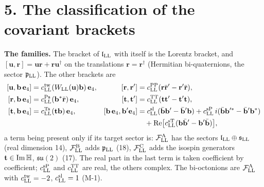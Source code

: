 \documentclass[
  10pt,
]{article}
\begin{document}
\hypertarget{the-classification-of-the-covariant-brackets}{%
\section{5. The classification of the covariant
brackets}\label{the-classification-of-the-covariant-brackets}}

\textbf{The families.} The bracket of \(\mathfrak l_{\rm LL}\) with
itself is the Lorentz bracket, and
\([\mathbf u,\mathbf r]=\mathbf u\mathbf r+\mathbf r\mathbf u^\dagger\)
on the translations \(\mathbf r=\mathbf r^\dagger\) (Hermitian
bi-quaternions, the sector \(\mathfrak p_{\rm LL}\)). The other brackets
are \[\begin{aligned}
[\mathbf u,\mathbf b\,\mathbf e_4]&=c^{\rm tw}_{\rm LL}(W_{\rm LL}(\mathbf u)\mathbf b)\,\mathbf e_4, &
[\mathbf r,\mathbf r']&=c^{\rm PP}_{\rm LL}(\mathbf r\bar{\mathbf r}'-\mathbf r'\bar{\mathbf r}),\\
[\mathbf r,\mathbf b\,\mathbf e_4]&=c^{\rm Ps}_{\rm LL}(\mathbf b^*\bar{\mathbf r})\,\mathbf e_4, &
[\mathbf t,\mathbf t']&=c^{\rm TT}_{\rm LL}(\mathbf t\mathbf t'-\mathbf t'\mathbf t),\\
[\mathbf t,\mathbf b\,\mathbf e_4]&=c^{\rm Ts}_{\rm LL}(\mathbf t\mathbf b)\,\mathbf e_4, &
[\mathbf b\,\mathbf e_4,\mathbf b'\mathbf e_4]&=c^{\rm sl}_{\rm LL}(\bar{\mathbf b}\mathbf b'-\bar{\mathbf b}'\mathbf b)+c^{\rm sP}_{\rm LL}\,i(\bar{\mathbf b}\mathbf b'^*-\bar{\mathbf b}'\mathbf b^*)\\
&&&\quad+\mathrm{Re}\big[c^{\rm sT}_{\rm LL}(\mathbf b\bar{\mathbf b}'-\mathbf b'\bar{\mathbf b})\big],
\end{aligned}\] a term being present only if its target sector is:
\(\mathcal F^{\rm A}_{\rm LL}\) has the sectors
\(\mathfrak l_{\rm LL}\oplus\mathfrak s_{\rm LL}\) (real dimension 14),
\(\mathcal F^{\rm B}_{\rm LL}\) adds \(\mathfrak p_{\rm LL}\) (18),
\(\mathcal F^{\rm C}_{\rm LL}\) adds the isospin generators
\(\mathbf t\in{\rm Im}\,\mathbb H\), \(\mathfrak{su}(2)\) (17). The real
part in the last term is taken coefficient by coefficient;
\(c^{\rm sP}_{\rm LL}\) and \(c^{\rm TT}_{\rm LL}\) are real, the others
complex. The bi-octonions are \(\mathcal F^{\rm A}_{\rm LL}\) with
\(c^{\rm tw}_{\rm LL}=-2\), \(c^{\rm sl}_{\rm LL}=1\) (M-1).
\end{document}
